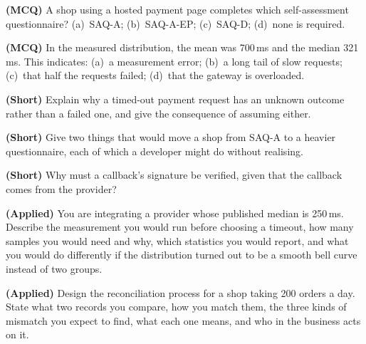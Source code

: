 \begin{reviewq}
  \item \textbf{(MCQ)} A shop using a hosted payment page completes which
        self-assessment questionnaire? (a)~SAQ-A; (b)~SAQ-A-EP; (c)~SAQ-D;
        (d)~none is required.
  \item \textbf{(MCQ)} In the measured distribution, the mean was 700\,ms and
        the median 321\,ms. This indicates: (a)~a measurement error;
        (b)~a long tail of slow requests; (c)~that half the requests failed;
        (d)~that the gateway is overloaded.
  \item \textbf{(Short)} Explain why a timed-out payment request has an unknown
        outcome rather than a failed one, and give the consequence of assuming
        either.
  \item \textbf{(Short)} Give two things that would move a shop from SAQ-A to a
        heavier questionnaire, each of which a developer might do without
        realising.
  \item \textbf{(Short)} Why must a callback's signature be verified, given
        that the callback comes from the provider?
  \item \textbf{(Applied)} You are integrating a provider whose published
        median is 250\,ms. Describe the measurement you would run before
        choosing a timeout, how many samples you would need and why, which
        statistics you would report, and what you would do differently if the
        distribution turned out to be a smooth bell curve instead of two
        groups.
  \item \textbf{(Applied)} Design the reconciliation process for a shop taking
        200 orders a day. State what two records you compare, how you match
        them, the three kinds of mismatch you expect to find, what each one
        means, and who in the business acts on it.
\end{reviewq}
